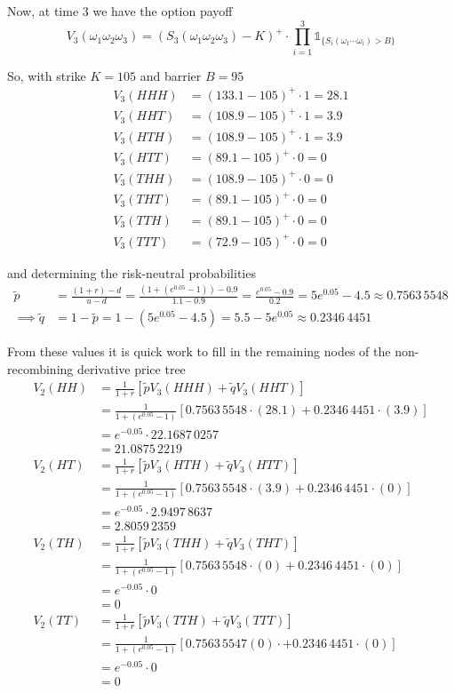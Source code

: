 \documentclass[12pt]{article}
\newlength\tindent
\renewcommand{\indent}{\hspace*{\tindent}}
\begin{document}
Now, at time 3 we have the option payoff
\begin{equation*}
	V_3(\omega_1\omega_2\omega_3) = (S_3(\omega_1\omega_2\omega_3) - K)^+ \cdot \prod^3_{i = 1} \mathds 1_{ \{ S_i(\omega_1\cdots\omega_i) > B \} }
\end{equation*}

So, with strike $K = 105$ and barrier $B = 95$
\begin{align*}
	V_3(HHH) &= (133.1 - 105)^+ \cdot 1 = 28.1 \\
	V_3(HHT) &= (108.9 - 105)^+ \cdot 1 = 3.9 \\
	V_3(HTH) &= (108.9 - 105)^+ \cdot 1 = 3.9 \\
	V_3(HTT) &= (89.1 - 105)^+ \cdot 0 = 0 \\
	V_3(THH) &= (108.9 - 105)^+ \cdot 0 = 0\\
	V_3(THT) &= (89.1 - 105)^+ \cdot 0 = 0 \\
	V_3(TTH) &= (89.1 - 105)^+ \cdot 0 = 0 \\
	V_3(TTT) &= (72.9 - 105)^+ \cdot 0 = 0
\end{align*}

and determining the risk-neutral probabilities
\begin{align*}
	\tilde{p} &= \frac{(1 + r) - d}{u - d} = \frac{(1 + (e^{0.05} - 1)) - 0.9}{1.1 - 0.9} = \frac{e^{0.05} - 0.9}{0.2} = 5e^{0.05} - 4.5 \approx 0.7563\,5548 \\
	\implies \tilde{q} &= 1 - \tilde{p} = 1 - (5e^{0.05} - 4.5) = 5.5 - 5e^{0.05} \approx 0.2346\,4451
\end{align*}

\indent From these values it is quick work to fill in the remaining nodes of the non-recombining derivative price tree
\begin{align*}
	V_2(HH) &= \frac{1}{1 + r} [\tilde{p}V_3(HHH) + \tilde{q}V_3(HHT)] \\
	&= \frac{1}{1 + (e^{0.05} - 1)} [0.7563\,5548 \cdot (28.1) + 0.2346\,4451 \cdot (3.9)] \\
	&= e^{-0.05} \cdot 22.1687\,0257 \\
	&= 21.0875\,2219 \\
	V_2(HT) &= \frac{1}{1 + r} [\tilde{p}V_3(HTH) + \tilde{q}V_3(HTT)] \\
	&= \frac{1}{1 + (e^{0.05} - 1)} [0.7563\,5548 \cdot (3.9) + 0.2346\,4451 \cdot (0) ]  \\
	&= e^{-0.05} \cdot 2.9497\,8637 \\
	&= 2.8059\,2359 \\
	V_2(TH) &= \frac{1}{1 + r} [\tilde{p}V_3(THH) + \tilde{q}V_3(THT)] \\
	&= \frac{1}{1 + (e^{0.05} - 1)} [0.7563\,5548 \cdot (0) + 0.2346\,4451 \cdot (0) ] \\
	&= e^{-0.05} \cdot 0 \\
	&= 0 \\
	V_2(TT) &= \frac{1}{1 + r} [\tilde{p}V_3(TTH) + \tilde{q}V_3(TTT)] \\
	&= \frac{1}{1 + (e^{0.05} - 1)} [0.7563\,5547 (0) \cdot + 0.2346\,4451 \cdot (0)] \\
	&= e^{-0.05} \cdot 0 \\
	&= 0
\end{align*}
\end{document}
